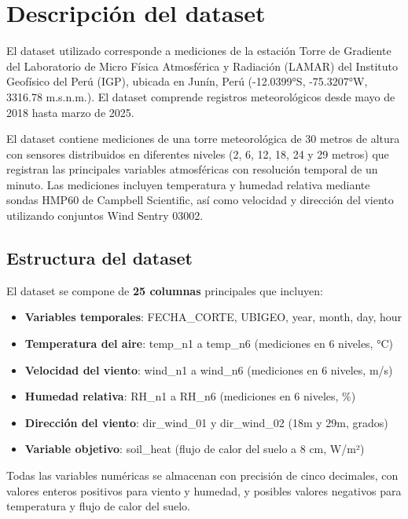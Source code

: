 
\section{Descripción del dataset}

El dataset utilizado corresponde a mediciones de la estación Torre de Gradiente
del Laboratorio de Micro Física Atmosférica y Radiación (LAMAR) del Instituto
Geofísico del Perú (IGP), ubicada en Junín, Perú (-12.0399°S, -75.3207°W,
3316.78 m.s.n.m.). El dataset comprende registros meteorológicos desde mayo de
2018 hasta marzo de 2025.

El dataset contiene mediciones de una torre meteorológica de 30 metros de altura
con sensores distribuidos en diferentes niveles (2, 6, 12, 18, 24 y 29 metros)
que registran las principales variables atmosféricas con resolución temporal de
un minuto. Las mediciones incluyen temperatura y humedad relativa mediante
sondas HMP60 de Campbell Scientific, así como velocidad y dirección del viento
utilizando conjuntos Wind Sentry 03002.

\subsection{Estructura del dataset}
El dataset se compone de \textbf{25 columnas} principales que incluyen:

\begin{itemize}
    \item \textbf{Variables temporales}: FECHA\_CORTE, UBIGEO, year, month, day, hour
    \item \textbf{Temperatura del aire}: temp\_n1 a temp\_n6 (mediciones en 6 niveles, °C)
    \item \textbf{Velocidad del viento}: wind\_n1 a wind\_n6 (mediciones en 6 niveles, m/s)
    \item \textbf{Humedad relativa}: RH\_n1 a RH\_n6 (mediciones en 6 niveles, \%)
    \item \textbf{Dirección del viento}: dir\_wind\_01 y dir\_wind\_02 (18m y 29m, grados)
    \item \textbf{Variable objetivo}: soil\_heat (flujo de calor del suelo a 8 cm, W/m²)
\end{itemize}

Todas las variables numéricas se almacenan con precisión de cinco decimales, con
valores enteros positivos para viento y humedad, y posibles valores negativos
para temperatura y flujo de calor del suelo.

